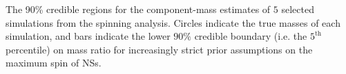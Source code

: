 \label{fig:comp_masses} The 90\% credible regions for the component-mass estimates of $5$ selected simulations from the spinning analysis.  Circles indicate the true masses of each simulation, and bars indicate the lower $90\%$ credible boundary (i.e. the $5^\mathrm{th}$ percentile) on mass ratio for increasingly strict prior assumptions on the maximum spin of NSs.
  